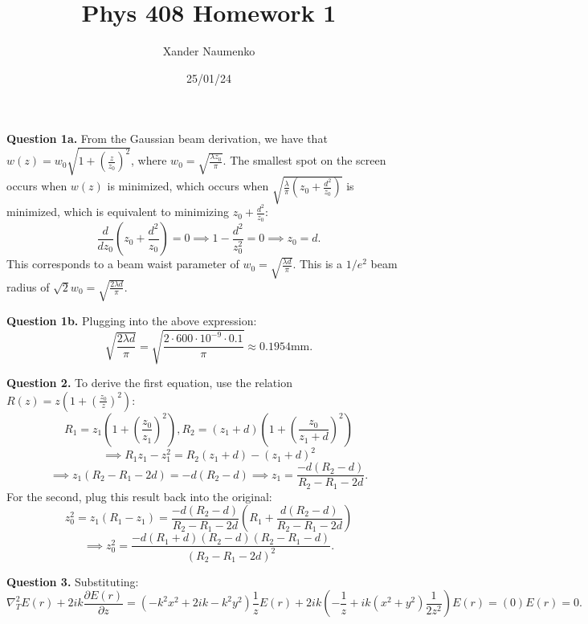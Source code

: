 \documentclass[letterpaper, reqno,11pt]{article}
\begin{document}
\title{Phys 408 Homework 1}
\date{25/01/24}
\author{Xander Naumenko}
\maketitle

{\medskip\noindent\bf Question 1a.} From the Gaussian beam derivation, we have that $w(z)=w_0\sqrt{1+\left( \frac{z}{z_0} \right) ^2}$, where $w_0=\sqrt{\frac{\lambda z_0}{\pi}}$. The smallest spot on the screen occurs when $w(z)$ is minimized, which occurs when $\sqrt{\frac{\lambda}{\pi}\left( z_0+ \frac{d^2}{z_0} \right) }$ is minimized, which is equivalent to minimizing $z_0+\frac{d^2}{z_0}$:
\[
    \frac{d}{dz_0}\left( z_0 + \frac{d^2}{z_0}\right) =0 \implies 1-\frac{d^2}{z_0^2}=0 \implies z_0=d
.\]
This corresponds to a beam waist parameter of $w_0= \sqrt{\frac{\lambda d}{\pi}}$. This is a $1 /e^2$ beam radius of $\sqrt{2}w_0= \sqrt{\frac{2\lambda d}{\pi}}$.

{\medskip\noindent\bf Question 1b.} Plugging into the above expression:
\[
\sqrt{\frac{2\lambda d}{\pi}}= \sqrt{\frac{2\cdot 600\cdot 10^{-9}\cdot 0.1}{\pi}}\approx 0.1954 \text{mm}
.\]

{\medskip\noindent\bf Question 2.} To derive the first equation, use the relation $R(z)=z \left( 1+\left( \frac{z_0}{z} \right) ^2 \right) $:
\[
R_1=z_1 \left( 1+\left( \frac{z_0}{z_1} \right) ^2 \right), R_2=\left( z_1+d \right)  \left( 1+\left( \frac{z_0}{z_1+d} \right) ^2 \right)
\]
\[
\implies R_1z_1-z_1^2=R_2\left( z_1+d \right) -(z_1+d)^2
\]
\[
\implies z_1\left( R_2-R_1-2d \right) =-d\left( R_2-d \right) \implies z_1= \frac{-d\left( R_2-d \right) }{R_2-R_1-2d}
.\]
For the second, plug this result back into the original:
\[
z_0^2=z_1(R_1-z_1)= \frac{-d(R_2-d)}{R_2-R_1-2d}\left( R_1+\frac{d(R_2-d)}{R_2-R_1-2d} \right) 
\]
\[
\implies z_0^2= \frac{-d(R_1+d)(R_2-d)(R_2-R_1-d)}{\left( R_2-R_1-2d \right) ^2}
.\]

{\medskip\noindent\bf Question 3.} Substituting:
\[
\nabla_T^2 E(r)+2ik \frac{\partial E(r)}{\partial z}=(-k^2x^2+2ik-k^2y^2) \frac{1}{z}E(r)+2ik\left( -\frac{1}{z}+ik(x^2+y^2) \frac{1}{2z^2} \right)E(r)=(0)E(r)=0
.\]
\end{document}
